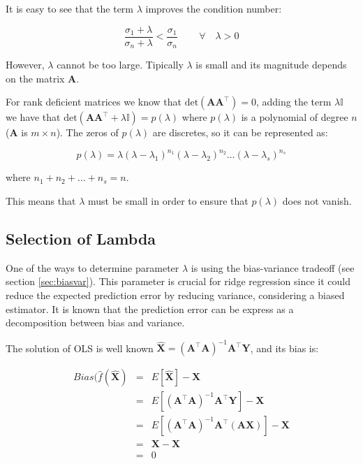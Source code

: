 It is easy to see that the term $\lambda$ improves the condition number: 

\begin{equation*}
        \frac{\sigma_1+\lambda}{\sigma_n + \lambda} <
        \frac{\sigma_1}{\sigma_n} \,  \qquad \forall \quad \lambda > 0
\end{equation*}


However, $\lambda$ cannot be too large. Tipically $\lambda$ is small and its
magnitude depends on the matrix $\mathbf{A}$.

For rank deficient matrices we know that $\text{det}(\mathbf{A A^\top})=0$, adding the
term $\lambda \mathbb{I}$ we have that $\text{det}(\mathbf{A A^\top}+\lambda \mathbb{I}) =
p(\lambda)$ where $p(\lambda)$ is a polynomial of degree $n$ ($\mathbf{A}$ is
$m \times n$). The zeros of $p(\lambda)$ are discretes, so it can be represented
as:

\[
p(\lambda) =
\lambda(\lambda-\lambda_1)^{n_1}(\lambda-\lambda_2)^{n_2}\dots(\lambda-\lambda_s)^{n_s}
\]

\noindent where $n_1 + n_2 + \dots + n_s = n$.

This means that $\lambda$ must be small in order to ensure that $p(\lambda)$
does not vanish.


\subsection{Selection of Lambda}

One of the ways to determine parameter $\lambda$ is using the bias-variance tradeoff (see section \ref{sec:biasvar}). This parameter is crucial for ridge regression since it could
reduce the expected prediction error by reducing variance, considering a biased
estimator. 
It is known that the prediction error can be express as a decomposition between bias and variance.

The solution of OLS is well known $\hat{\mathbf{X}}=(\mathbf{A}^\top \mathbf{A})^{-1}\mathbf{A}^\top \mathbf{Y}$, and its bias is:

\begin{eqnarray*}
Bias(\hat{f}(\hat{\mathbf{X}}) &=& E[\hat{\mathbf{X}}] - \mathbf{X} \\
&=& E[ (\mathbf{A}^\top \mathbf{A})^{-1}\mathbf{A}^\top \mathbf{Y}] - \mathbf{X} \\
&=& E[ (\mathbf{A}^\top \mathbf{A})^{-1}\mathbf{A}^\top (\mathbf{AX})] - \mathbf{X}  \\
&=& \mathbf{X}  - \mathbf{X}  \\
&=&  0
\end{eqnarray*}


